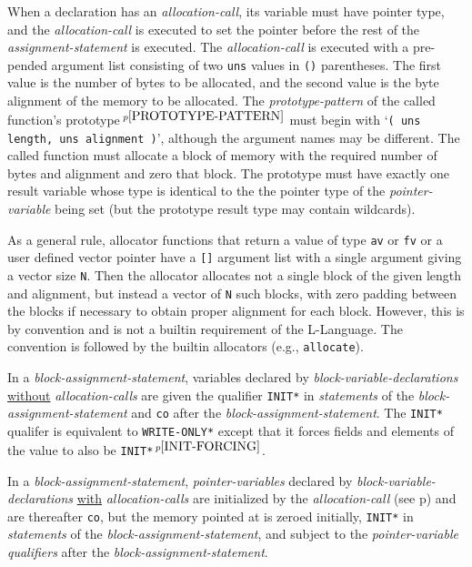 \documentclass[12pt]{article}
\newcommand{\pagref}[1]{p\pageref{#1}}
\newcommand{\pagnote}[1]{$\,^{p\pageref{#1}}$}
\newcommand{\EOL}{\penalty \exhyphenpenalty}
\begin{document}
When a declaration has an {\em allocation-call}\label{ALLOCATION-CALLS},
its variable must have pointer
type, and the {\em allocation-call} is executed to set the pointer
before the rest of the {\em assignment-statement} is
executed.  The {\em allocation-call} is executed
with a pre-pended argument list consisting of two {\tt uns} values
in {\tt ()} parentheses.  The first value is the number of bytes to
be allocated, and the second value is the byte alignment of the
memory to be allocated.
The {\em prototype-pattern}
of the called function's prototype\pagnote{PROTOTYPE-PATTERN}
must begin with `{\tt ( uns length, uns alignment )}', although
the argument names may be different.
The called function must allocate a block of
memory with the required number of bytes and alignment and zero that
block.  The prototype must have
exactly one result variable whose type is identical to the
the pointer type of the {\em pointer-variable} being set (but the
prototype result type may contain wildcards).

As a general rule, allocator functions that return a value of
type {\tt av} or {\tt fv} or a user defined vector pointer
have a {\tt []} argument list
with a single argument giving a vector size {\tt N}.
Then the allocator allocates not a single block of the given length
and alignment, but instead a vector of {\tt N} such blocks, with zero padding
between the blocks if necessary to obtain proper alignment for each
block.  However,
this is by convention and is not a builtin requirement of the L-Language.
The convention is followed by the builtin allocators (e.g., {\tt allocate}).

In a {\em block-assignment-statement},
variables declared by {\em block-variable-declarations}
\underline{without} {\em allocation-calls}
are given the qualifier {\tt *INIT*} in {\em statements}
of the {\em block-assignment-statement} and {\tt co} after the
{\em block-assignment-statement}.
The {\tt *INIT*} qualifer is equivalent to {\tt *WRITE-\EOL ONLY*}
except that it forces fields and elements of the value to also
be {\tt *INIT*}\pagnote{INIT-FORCING}.

In a {\em block-assignment-statement},
{\em pointer-variables} declared by {\em block-variable-declarations}
\underline{with} {\em allocation-calls}
are initialized by the {\em allocation-call}
(see \pagref{ALLOCATION-CALLS}) and are thereafter
{\tt co}, but the memory
pointed at is zeroed initially,
{\tt *INIT*} in {\em statements}
of the {\em block-assignment-statement}, and
subject to the {\em pointer-variable} {\em qualifiers} after
the {\em block-assignment-statement}.
\end{document}
